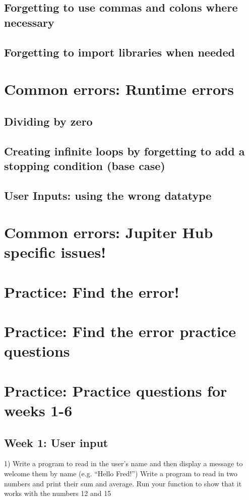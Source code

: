 \documentclass{article}
\begin{document}
	\subsection{Forgetting to use commas and colons where necessary}
	
	
	\subsection{Forgetting to import libraries when needed}
	
	\section{Common errors: Runtime errors}
	
	\subsection{Dividing by zero}
	
	\subsection{Creating infinite loops by forgetting to add a stopping condition (base case)}
	
	\subsection{User Inputs: using the wrong datatype}
	
	\section{Common errors: Jupiter Hub specific issues!}
	\section{Practice: Find the error!}
	\section{Practice: Find the error practice questions}
	
	\section{Practice: Practice questions for weeks 1-6}
	
	\subsection{Week 1: User input}
	1) Write a program to read in the user’s name and then display a message to welcome them by name (e.g.  “Hello Fred!”) 
	Write a program to read in two numbers and print their sum and average. Run your function to show that it works with the numbers 12 and 15
\end{document}
